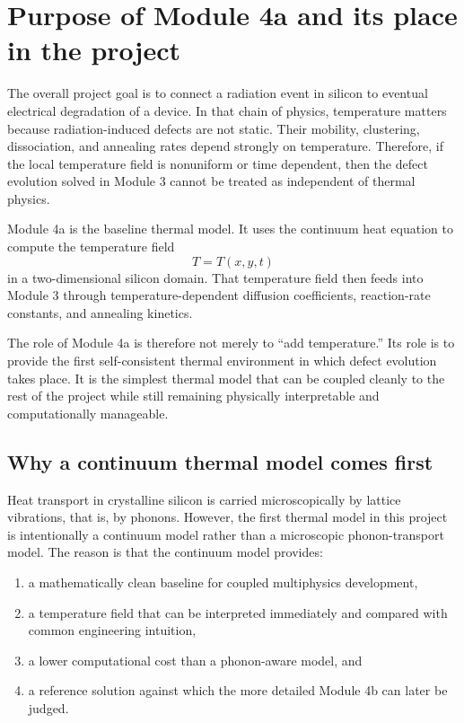 \documentclass[11pt]{article}
\begin{document}
\section{Purpose of Module 4a and its place in the project}

The overall project goal is to connect a radiation event in silicon to eventual electrical degradation of a device. In that chain of physics, temperature matters because radiation-induced defects are not static. Their mobility, clustering, dissociation, and annealing rates depend strongly on temperature. Therefore, if the local temperature field is nonuniform or time dependent, then the defect evolution solved in Module 3 cannot be treated as independent of thermal physics.

Module 4a is the baseline thermal model. It uses the continuum heat equation to compute the temperature field
\[
T = T(x,y,t)
\]
in a two-dimensional silicon domain. That temperature field then feeds into Module 3 through temperature-dependent diffusion coefficients, reaction-rate constants, and annealing kinetics.

The role of Module 4a is therefore not merely to ``add temperature.'' Its role is to provide the first self-consistent thermal environment in which defect evolution takes place. It is the simplest thermal model that can be coupled cleanly to the rest of the project while still remaining physically interpretable and computationally manageable.

\subsection{Why a continuum thermal model comes first}

Heat transport in crystalline silicon is carried microscopically by lattice vibrations, that is, by phonons. However, the first thermal model in this project is intentionally a continuum model rather than a microscopic phonon-transport model. The reason is that the continuum model provides:
\begin{enumerate}[label=\arabic*.]
    \item a mathematically clean baseline for coupled multiphysics development,
    \item a temperature field that can be interpreted immediately and compared with common engineering intuition,
    \item a lower computational cost than a phonon-aware model, and
    \item a reference solution against which the more detailed Module 4b can later be judged.
\end{enumerate}
\end{document}

